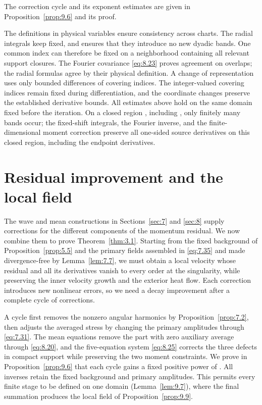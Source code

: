 The correction cycle and its exponent estimates are given in Proposition~\ref{prop:9.6} and its
proof.

The definitions in physical variables ensure consistency across charts. The radial integrals keep
 fixed, and  ensures that they introduce
no new dyadic bands. One common index can therefore be fixed on a neighborhood containing all
relevant support closures. The Fourier covariance \eqref{eq:8.23} proves agreement on overlaps; the
radial formulas agree by their physical definition. A change of representation uses only bounded
differences of covering indices. The integer-valued covering indices remain fixed during
differentiation, and the coordinate changes preserve the established derivative bounds. All estimates
above hold on the same domain  fixed before the iteration. On a closed
region , including , only finitely
many bands occur; the fixed-shift integrals, the Fourier inverse, and the finite-dimensional moment
correction preserve all one-sided source derivatives on this closed region, including the endpoint
derivatives.

\section{Residual improvement and the local field}\label{sec:9}
The wave and mean constructions in Sections~\ref{sec:7} and \ref{sec:8} supply corrections for the
different components of the momentum residual. We now combine them to prove Theorem~\ref{thm:3.1}.
Starting from the fixed background  of
Proposition~\ref{prop:5.5} and the primary fields assembled in \eqref{eq:7.35} and made
divergence-free by Lemma~\ref{lem:7.7}, we must obtain a local velocity
 whose residual and all its derivatives vanish to every order at
the singularity, while preserving the inner velocity growth and the exterior heat flow. Each
correction introduces new nonlinear errors, so we need a decay improvement after a complete cycle of
corrections.

A cycle first removes the nonzero angular harmonics by Proposition~\ref{prop:7.2}, then adjusts the
averaged stress by changing the primary amplitudes through \eqref{eq:7.31}. The mean equations
remove the part with zero auxiliary average through \eqref{eq:8.20}, and the five-equation system
\eqref{eq:8.25} corrects the three defects in compact support while preserving the two moment
constraints. We prove in Proposition~\ref{prop:9.6} that each cycle gains a fixed positive power of
. All inverses retain the fixed background and primary amplitudes.
This permits every finite stage to be defined on one domain (Lemma~\ref{lem:9.7}), where the final
summation produces the local field of Proposition~\ref{prop:9.9}.

